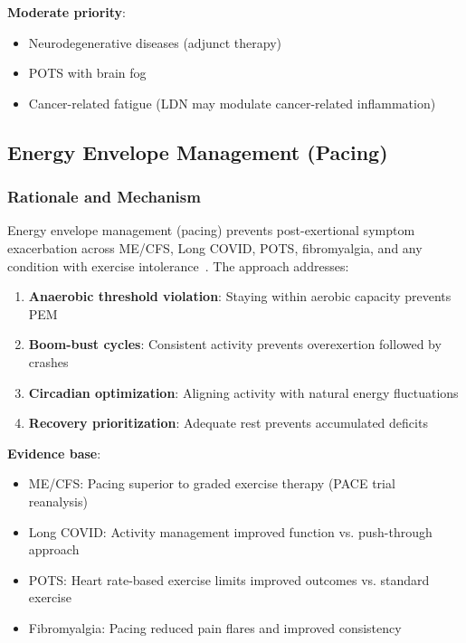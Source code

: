 \textbf{Moderate priority}:
\begin{itemize}
    \item Neurodegenerative diseases (adjunct therapy)
    \item POTS with brain fog
    \item Cancer-related fatigue (LDN may modulate cancer-related inflammation)
\end{itemize}

\subsection{Energy Envelope Management (Pacing)}
\label{sec:pacing-universal}

\subsubsection{Rationale and Mechanism}

Energy envelope management (pacing) prevents post-exertional symptom exacerbation across ME/CFS, Long COVID, POTS, fibromyalgia, and any condition with exercise intolerance~\cite{JasonEtAl2010}. The approach addresses:

\begin{enumerate}
    \item \textbf{Anaerobic threshold violation}: Staying within aerobic capacity prevents PEM
    \item \textbf{Boom-bust cycles}: Consistent activity prevents overexertion followed by crashes
    \item \textbf{Circadian optimization}: Aligning activity with natural energy fluctuations
    \item \textbf{Recovery prioritization}: Adequate rest prevents accumulated deficits
\end{enumerate}

\textbf{Evidence base}:
\begin{itemize}
    \item ME/CFS: Pacing superior to graded exercise therapy (PACE trial reanalysis)~\cite{Wilshire2018}
    \item Long COVID: Activity management improved function vs. push-through approach
    \item POTS: Heart rate-based exercise limits improved outcomes vs. standard exercise
    \item Fibromyalgia: Pacing reduced pain flares and improved consistency
\end{itemize}

